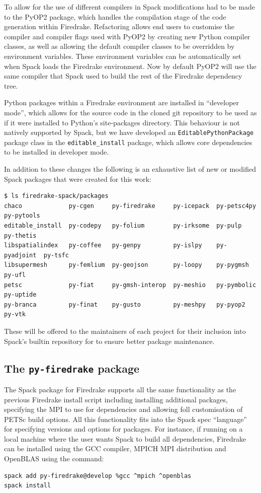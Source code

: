 \documentclass[a4paper,11pt]{article}
\begin{document}
To allow for the use of different compilers in Spack modifications had to be made to the PyOP2 package, which handles the compilation stage of the code generation within Firedrake.
Refactoring allows end users to customise the compiler and compiler flags used with PyOP2 by creating new Python compiler classes, as well as allowing the default compiler classes to be overridden by environment variables.
These environment variables can be automatically set when Spack loads the Firedrake environment.
Now by default PyOP2 will use the same compiler that Spack used to build the rest of the Firedrake dependency tree.

Python packages within a Firedrake environment are installed in ``developer mode'', which allows for the source code in the cloned git repository to be used as if it were installed to Python's site-packages directory.
This behaviour is not natively supported by Spack, but we have developed an \verb`EditablePythonPackage` package class in the \verb`editable_install` package, which allows core dependencies to be installed in developer mode.

In addition to these changes the following is an exhaustive list of new or modified Spack packages that were created for this work:
\begin{lstlisting}
$ ls firedrake-spack/packages
chaco             py-cgen     py-firedrake     py-icepack  py-petsc4py   py-pytools
editable_install  py-codepy   py-folium        py-irksome  py-pulp       py-thetis
libspatialindex   py-coffee   py-genpy         py-islpy    py-pyadjoint  py-tsfc
libsupermesh      py-femlium  py-geojson       py-loopy    py-pygmsh     py-ufl
petsc             py-fiat     py-gmsh-interop  py-meshio   py-pymbolic   py-uptide
py-branca         py-finat    py-gusto         py-meshpy   py-pyop2      py-vtk
\end{lstlisting}
These will be offered to the maintainers of each project for their inclusion into Spack's builtin repository for to ensure better package maintenance.


\subsection{The \texttt{py-firedrake} package}
\label{ssec:py-firedrake}
The Spack package for Firedrake supports all the same functionality as the previous Firedrake install script including installing additional packages, specifying the MPI to use for dependencies and allowing foll customisation of PETSc build options.
All this functionality fits into the Spack spec ``language'' for specifying versions and options for packages.
For instance, if running on a local machine where the user wants Spack to build all dependencies, Firedrake can be installed using the GCC compiler, MPICH MPI distribution and OpenBLAS using the command:
\begin{lstlisting}
spack add py-firedrake@develop %gcc ^mpich ^openblas
spack install
\end{lstlisting}
\end{document}
